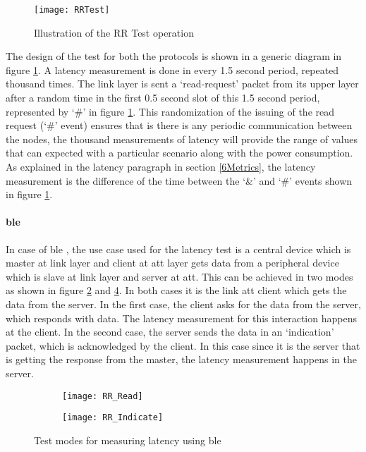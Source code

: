 \begin{figure}[h]
\centering
\texttt{[image: RRTest]}
\caption{Illustration of the RR Test operation}
\label{fig:RRTest}
\end{figure}

The design of the test for both the protocols is shown in a generic diagram in figure \ref{fig:RRTest}. A latency measurement is done in every 1.5 second period, repeated thousand times. The link layer is sent a `read-request' packet from its upper layer after a random time in the first 0.5 second slot of this 1.5 second period, represented by `\#' in figure \ref{fig:RRTest}. This randomization of the issuing of the read request (`\#' event) ensures that is there is any periodic communication between the nodes, the thousand measurements of latency will provide the range of values that can expected with a particular scenario along with the power consumption. As explained in the latency paragraph in section \ref{6Metrics}, the latency measurement is the difference of the time between the `\&' and `\#' events shown in figure \ref{fig:RRTest}.


\paragraph{\gls{ble} }
In case of \gls{ble} , the use case used for the latency test is a central device which is master at link layer and client at \gls{att} layer gets data from a peripheral device which is slave at link layer and server at \gls{att}. This can be achieved in two modes as shown in figure \ref{fig:RR_Read} and \ref{fig:RR_Indicate}. In both cases it is the link \gls{att} client which gets the data from the server. In the first case, the client asks for the data from the server, which responds with data. The latency measurement for this interaction happens at the client. In the second case, the server sends the data in an `indication' packet, which is acknowledged by the client. In this case since it is the server that is getting the response from the master, the latency measurement happens in the server.

\begin{figure}[h]
	\vspace{10 pt}
	\begin{subfigure}[t]{0.49\linewidth}
		\centering
		\texttt{[image: RR\_Read]}
		\label{fig:RR_Read}
	\end{subfigure}
	\begin{subfigure}[t]{0.49\linewidth}
		\centering
		\texttt{[image: RR\_Indicate]}
		\label{fig:RR_Indicate}
	\end{subfigure}
	\caption{Test modes for measuring latency using \gls{ble}}
\end{figure}

